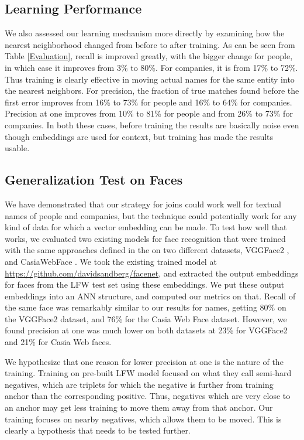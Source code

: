 \subsection{Learning Performance}

 We also assessed our learning mechanism more directly by examining how the nearest neighborhood changed from before to after training.  As can be seen from Table \ref{Evaluation}, recall is improved greatly, with the bigger change for people, in which case it improves from 3\% to 80\%.  For companies, it is from 17\% to 72\%.  Thus training is clearly effective in moving actual names for the same entity into the nearest neighbors.  For precision, the fraction of true matches found before the first error improves from 16\% to 73\% for people and 16\% to 64\% for companies.  Precision at one improves from 10\% to 81\% for people and from 26\% to 73\% for companies.  In both these cases, before training the results are basically noise even though embeddings are used for context, but training has made the results usable.

\subsection{Generalization Test on Faces}

 We have demonstrated that our strategy for joins could work well for textual names of people and companies, but the technique could potentially work for any kind of data for which a vector embedding can be made.  To test how well that works, we evaluated two existing models for face recognition that were trained with the same approaches defined in the \cite{DBLP:conf/cvpr/SchroffKP15} on two different datasets, VGGFace2 \cite{DBLP:conf/fgr/CaoSXPZ18}, and CasiaWebFace \cite{DBLP:conf/cvpr/SchroffKP15}.  We took the existing trained model at \url{https://github.com/davidsandberg/facenet}, and extracted the output embeddings for faces from the LFW test set \cite{Huang2012a} using these embeddings.  We put these output embeddings into an ANN structure, and computed our metrics on that.  Recall of the same face was remarkably similar to our results for names, getting 80\% on the VGGFace2 dataset, and 76\% for the Casia Web Face dataset.  However, we found precision at one was much lower on both datasets at 23\% for VGGFace2 and 21\% for Casia Web faces.

We hypothesize that one reason for lower precision at one is the nature of the training.  Training on pre-built LFW model focused on what they call semi-hard negatives, which are triplets for which the negative is further from training anchor than the corresponding positive.  Thus, negatives which are very close to an anchor may get less training to move them away from that anchor.  Our training focuses on nearby negatives, which allows them to be moved.  This is clearly a hypothesis that needs to be tested further.

